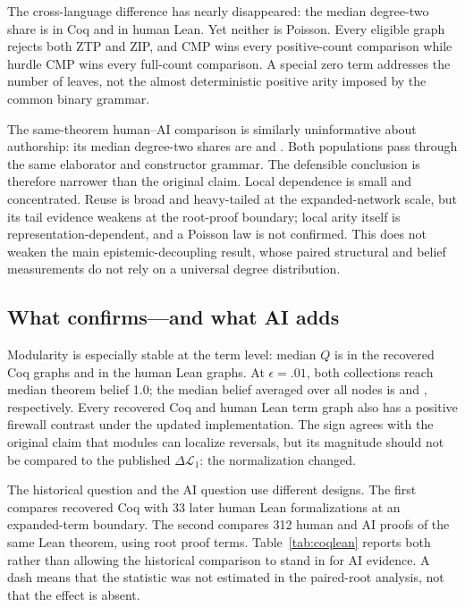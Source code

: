 \documentclass[11pt]{article}
\begin{document}
The cross-language difference has nearly disappeared: the median degree-two share is
\NormCoqDegreeTwo{} in Coq and \NormLeanDegreeTwo{} in human Lean.  Yet neither is Poisson.  Every
eligible graph rejects both ZTP and ZIP, and CMP wins every positive-count comparison while hurdle
CMP wins every full-count comparison.  A special zero term addresses the number of leaves, not the
almost deterministic positive arity imposed by the common binary grammar.

The same-theorem human--AI comparison is similarly uninformative about authorship: its median
degree-two shares are \NormHumanDegreeTwo{} and \NormAIDegreeTwo{}.  Both populations pass through
the same elaborator and constructor grammar.  The defensible conclusion is therefore narrower than
the original claim.  Local dependence is small and concentrated.  Reuse is broad and heavy-tailed
at the expanded-network scale, but its tail evidence weakens at the root-proof boundary; local
arity itself is representation-dependent, and a Poisson law is not confirmed.  This does not
weaken the main epistemic-decoupling result, whose paired structural and belief measurements do not
rely on a universal degree distribution.

\subsection{What confirms---and what AI adds}

Modularity is especially stable at the term level: median $Q$ is \CoqModularity{} in the recovered
Coq graphs and \LeanModularity{} in the human Lean graphs.  At $\epsilon=.01$, both collections reach
median theorem belief 1.0; the median belief averaged over all nodes is \CoqMeanBelief{} and
\LeanMeanBelief{}, respectively.  Every recovered Coq and human Lean term graph also has a positive
firewall contrast under the updated implementation.  The sign agrees with the original claim that
modules can localize reversals, but its magnitude should not be compared to the published
$\Delta\mathcal L_1$: the normalization changed.

The historical question and the AI question use different designs.  The first compares recovered
Coq with 33 later human Lean formalizations at an expanded-term boundary.  The second compares 312
human and AI proofs of the same Lean theorem, using root proof terms.  Table~\ref{tab:coqlean}
reports both rather than allowing the historical comparison to stand in for AI evidence.  A dash
means that the statistic was not estimated in the paired-root analysis, not that the effect is
absent.
\end{document}
